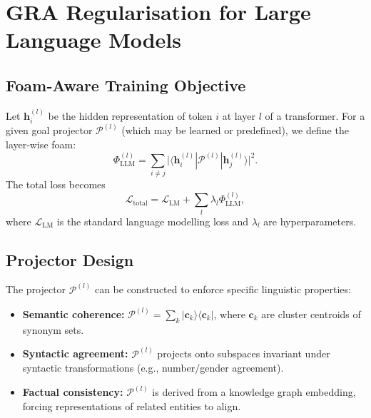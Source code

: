 \documentclass[11pt]{article}
\newcommand{\cP}{\mathcal{P}}
\begin{document}
\section{GRA Regularisation for Large Language Models}
\label{sec:llm}

\subsection{Foam‑Aware Training Objective}
Let $\mathbf{h}_i^{(l)}$ be the hidden representation of token $i$ at layer $l$ of a transformer. For a given goal projector $\cP^{(l)}$ (which may be learned or predefined), we define the layer‑wise foam:
\[
\Phi_{\text{LLM}}^{(l)} = \sum_{i \neq j} \bigl| \langle \mathbf{h}_i^{(l)} | \cP^{(l)} | \mathbf{h}_j^{(l)} \rangle \bigr|^2.
\]
The total loss becomes
\[
\mathcal{L}_{\text{total}} = \mathcal{L}_{\text{LM}} + \sum_{l} \lambda_l \Phi_{\text{LLM}}^{(l)},
\]
where $\mathcal{L}_{\text{LM}}$ is the standard language modelling loss and $\lambda_l$ are hyperparameters.

\subsection{Projector Design}
The projector $\cP^{(l)}$ can be constructed to enforce specific linguistic properties:
\begin{itemize}
    \item \textbf{Semantic coherence:} $\cP^{(l)} = \sum_{k} |\mathbf{c}_k\rangle\langle \mathbf{c}_k|$, where $\mathbf{c}_k$ are cluster centroids of synonym sets.
    \item \textbf{Syntactic agreement:} $\cP^{(l)}$ projects onto subspaces invariant under syntactic transformations (e.g., number/gender agreement).
    \item \textbf{Factual consistency:} $\cP^{(l)}$ is derived from a knowledge graph embedding, forcing representations of related entities to align.
\end{itemize}
\end{document}
